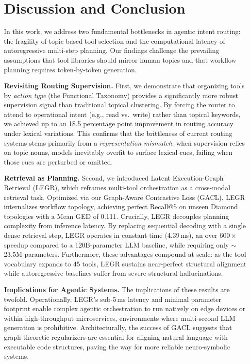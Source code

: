 \documentclass{article}
\begin{document}
\section{Discussion and Conclusion}

In this work, we address two fundamental bottlenecks in agentic intent routing: the fragility of topic-based tool selection and the computational latency of autoregressive multi-step planning. Our findings challenge the prevailing assumptions that tool libraries should mirror human topics and that workflow planning requires token-by-token generation.

\textbf{Revisiting Routing Supervision.} First, we demonstrate that organizing tools by \emph{action type} (the Functional Taxonomy) provides a significantly more robust supervision signal than traditional topical clustering. By forcing the router to attend to operational intent (e.g., read vs.\ write) rather than topical keywords, we achieved up to an 18.5 percentage point improvement in routing accuracy under lexical variations. This confirms that the brittleness of current routing systems stems primarily from a \textit{representation mismatch}: when supervision relies on topic nouns, models inevitably overfit to surface lexical cues, failing when those cues are perturbed or omitted.

\textbf{Retrieval as Planning.} Second, we introduced Latent Execution-Graph Retrieval (LEGR), which reframes multi-tool orchestration as a cross-modal retrieval task. Optimized via our Graph-Aware Contrastive Loss (GACL), LEGR internalizes workflow topology, achieving perfect Recall@5 on unseen Diamond topologies with a Mean GED of 0.111. Crucially, LEGR decouples planning complexity from inference latency. By replacing sequential decoding with a single dense retrieval step, LEGR operates in constant time (4.39\,ms), an over $600\times$ speedup compared to a 120B-parameter LLM baseline, while requiring only $\sim$23.5M parameters. Furthermore, these advantages compound at scale: as the tool vocabulary expands to 45 tools, LEGR sustains near-perfect structural alignment while autoregressive baselines suffer from severe structural hallucinations.

\textbf{Implications for Agentic Systems.} The implications of these results are twofold. Operationally, LEGR's sub-5\,ms latency and minimal parameter footprint enable complex agentic orchestration to run natively on edge devices or within high-throughput microservices, environments where multi-second LLM generation is prohibitive. Architecturally, the success of GACL suggests that graph-theoretic regularizers are essential for aligning natural language with executable code structures, paving the way for more reliable neuro-symbolic systems.
\end{document}
